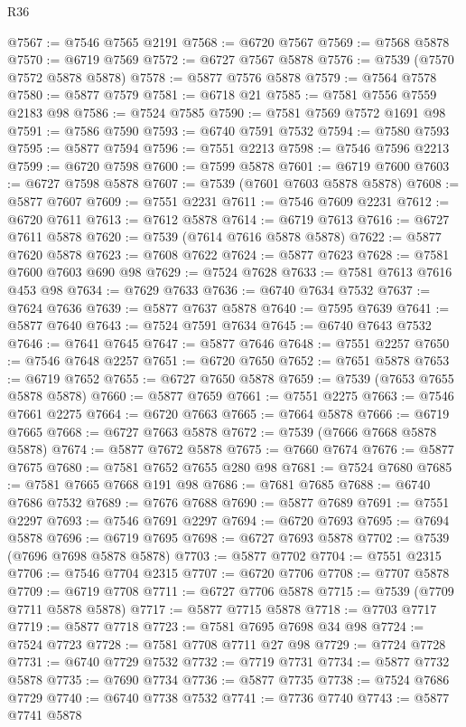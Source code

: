 \begin{lexlean}{R36}
\begin{coremodule}
@7567 := @7546 @7565 @2191
@7568 := @6720 @7567
@7569 := @7568 @5878
@7570 := @6719 @7569
@7572 := @6727 @7567 @5878
@7576 := @7539 (@7570 @7572 @5878 @5878)
@7578 := @5877 @7576 @5878
@7579 := @7564 @7578
@7580 := @5877 @7579
@7581 := @6718 @21
@7585 := @7581 @7556 @7559 @2183 @98
@7586 := @7524 @7585
@7590 := @7581 @7569 @7572 @1691 @98
@7591 := @7586 @7590
@7593 := @6740 @7591 @7532
@7594 := @7580 @7593
@7595 := @5877 @7594
@7596 := @7551 @2213
@7598 := @7546 @7596 @2213
@7599 := @6720 @7598
@7600 := @7599 @5878
@7601 := @6719 @7600
@7603 := @6727 @7598 @5878
@7607 := @7539 (@7601 @7603 @5878 @5878)
@7608 := @5877 @7607
@7609 := @7551 @2231
@7611 := @7546 @7609 @2231
@7612 := @6720 @7611
@7613 := @7612 @5878
@7614 := @6719 @7613
@7616 := @6727 @7611 @5878
@7620 := @7539 (@7614 @7616 @5878 @5878)
@7622 := @5877 @7620 @5878
@7623 := @7608 @7622
@7624 := @5877 @7623
@7628 := @7581 @7600 @7603 @690 @98
@7629 := @7524 @7628
@7633 := @7581 @7613 @7616 @453 @98
@7634 := @7629 @7633
@7636 := @6740 @7634 @7532
@7637 := @7624 @7636
@7639 := @5877 @7637 @5878
@7640 := @7595 @7639
@7641 := @5877 @7640
@7643 := @7524 @7591 @7634
@7645 := @6740 @7643 @7532
@7646 := @7641 @7645
@7647 := @5877 @7646
@7648 := @7551 @2257
@7650 := @7546 @7648 @2257
@7651 := @6720 @7650
@7652 := @7651 @5878
@7653 := @6719 @7652
@7655 := @6727 @7650 @5878
@7659 := @7539 (@7653 @7655 @5878 @5878)
@7660 := @5877 @7659
@7661 := @7551 @2275
@7663 := @7546 @7661 @2275
@7664 := @6720 @7663
@7665 := @7664 @5878
@7666 := @6719 @7665
@7668 := @6727 @7663 @5878
@7672 := @7539 (@7666 @7668 @5878 @5878)
@7674 := @5877 @7672 @5878
@7675 := @7660 @7674
@7676 := @5877 @7675
@7680 := @7581 @7652 @7655 @280 @98
@7681 := @7524 @7680
@7685 := @7581 @7665 @7668 @191 @98
@7686 := @7681 @7685
@7688 := @6740 @7686 @7532
@7689 := @7676 @7688
@7690 := @5877 @7689
@7691 := @7551 @2297
@7693 := @7546 @7691 @2297
@7694 := @6720 @7693
@7695 := @7694 @5878
@7696 := @6719 @7695
@7698 := @6727 @7693 @5878
@7702 := @7539 (@7696 @7698 @5878 @5878)
@7703 := @5877 @7702
@7704 := @7551 @2315
@7706 := @7546 @7704 @2315
@7707 := @6720 @7706
@7708 := @7707 @5878
@7709 := @6719 @7708
@7711 := @6727 @7706 @5878
@7715 := @7539 (@7709 @7711 @5878 @5878)
@7717 := @5877 @7715 @5878
@7718 := @7703 @7717
@7719 := @5877 @7718
@7723 := @7581 @7695 @7698 @34 @98
@7724 := @7524 @7723
@7728 := @7581 @7708 @7711 @27 @98
@7729 := @7724 @7728
@7731 := @6740 @7729 @7532
@7732 := @7719 @7731
@7734 := @5877 @7732 @5878
@7735 := @7690 @7734
@7736 := @5877 @7735
@7738 := @7524 @7686 @7729
@7740 := @6740 @7738 @7532
@7741 := @7736 @7740
@7743 := @5877 @7741 @5878

\end{coremodule}
\end{lexlean}
